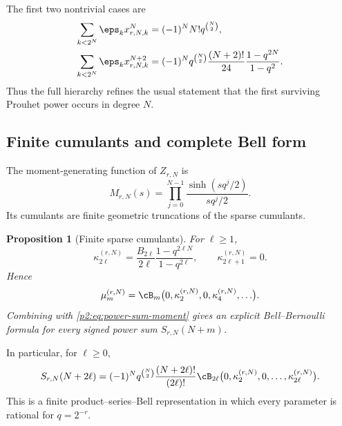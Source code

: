 \documentclass[11pt,oneside]{article}
\newtheorem{proposition}[theorem]{Proposition}
\theoremstyle{definition}
\begin{document}
The first two nontrivial cases are
\begin{align}
 \sum_{k<2^N}\eps_kx_{r,N,k}^{N}
 &=(-1)^NN!q^{\binom N2},                                 \label{p2:eq:first-survivor}\\
 \sum_{k<2^N}\eps_kx_{r,N,k}^{N+2}
 &=(-1)^Nq^{\binom N2}\frac{(N+2)!}{24}
   \frac{1-q^{2N}}{1-q^2}.                                \label{p2:eq:second-survivor}
\end{align}
Thus the full hierarchy refines the usual statement that the first surviving
Prouhet power occurs in degree $N$.

\subsection{Finite cumulants and complete Bell form}

The moment-generating function of $Z_{r,N}$ is
\begin{equation}
 M_{r,N}(s)=\prod_{j=0}^{N-1}\frac{\sinh(sq^j/2)}{sq^j/2}. \label{p2:eq:MrN}
\end{equation}
Its cumulants are finite geometric truncations of the sparse cumulants.

\begin{proposition}[Finite sparse cumulants]
\label{p2:prop:finite-sparse-cumulants}
For $\ell\ge1$,
\begin{equation}
 \kappa_{2\ell}^{(r,N)}
 =\frac{B_{2\ell}}{2\ell}
   \frac{1-q^{2\ell N}}{1-q^{2\ell}},
 \qquad
 \kappa_{2\ell+1}^{(r,N)}=0.                              \label{p2:eq:finite-cumulants}
\end{equation}
Hence
\begin{equation}
 \mu_m^{(r,N)}
 =\cB_m\bigl(0,\kappa_2^{(r,N)},0,\kappa_4^{(r,N)},\ldots\bigr). \label{p2:eq:finite-Bell-moments}
\end{equation}
Combining with \eqref{p2:eq:power-sum-moment} gives an explicit
Bell--Bernoulli formula for every signed power sum $S_{r,N}(N+m)$.
\end{proposition}

In particular, for $\ell\ge0$,
\begin{equation}
 S_{r,N}(N+2\ell)
 =(-1)^Nq^{\binom N2}\frac{(N+2\ell)!}{(2\ell)!}
 \cB_{2\ell}\bigl(0,\kappa_2^{(r,N)},0,\ldots,
                    \kappa_{2\ell}^{(r,N)}\bigr).          \label{p2:eq:Bell-power-sum}
\end{equation}
This is a finite product--series--Bell representation in which every parameter
is rational for $q=2^{-r}$.
\end{document}
